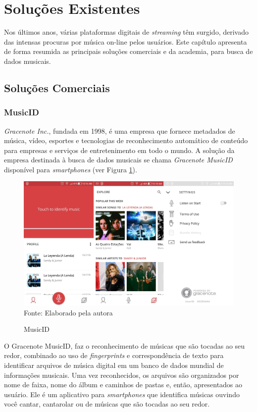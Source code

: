 \section{Soluções Existentes} \label{cap:solucoes}
Nos últimos anos, várias plataformas digitais de \textit{streaming} têm surgido, derivado das intensas procuras por música on-line pelos usuários. Este capítulo apresenta de forma resumida as principais soluções comerciais e da academia, para busca de dados musicais.

\subsection{Soluções Comerciais} \label{sec:comercial}

\subsubsection{MusicID} \label{subsec:musicid}
\textit{Gracenote Inc.}, fundada em 1998, é uma empresa que fornece metadados de música, vídeo, esportes e tecnologias de reconhecimento automático de conteúdo para empresas e serviços de entretenimento em todo o mundo. A solução da empresa destinada à busca de dados musicais se chama \textit{Gracenote MusicID\textregistered} disponível para \textit{smartphones} (ver Figura \ref{fig:musicID}).

\begin{figure}[!htb]
   \centering
   \caption{MusicID}\label{fig:musicID} 
   \includegraphics[scale=0.12]{figuras/MusicID.jpg}
   \\Fonte: Elaborado pela autora
\end{figure}

O Gracenote MusicID\textregistered, faz o reconhecimento de músicas que são tocadas ao seu redor, combinado ao uso de \textit{fingerprints} e correspondência de texto para identificar arquivos de música digital em um banco de dados mundial de informações musicais. Uma vez reconhecidos, os arquivos são organizados por nome de faixa, nome do álbum e caminhos de pastas e, então, apresentados ao usuário. Ele é um aplicativo para \textit{smartphones} que identifica músicas ouvindo você cantar, cantarolar ou de músicas que são tocadas ao seu redor.


